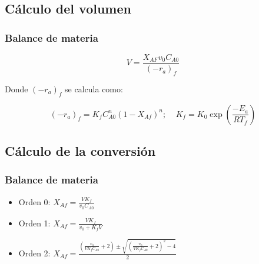 \documentclass[20pt,a4paper]{extarticle}
\begin{document}
	\subsection{Cálculo del volumen}
		\subsubsection{Balance de materia}
			\begin{equation*}
				V= \frac{X_{AF}v_0C_{A0}}{(-r_a)_f}
			\end{equation*}
			
			Donde $(-r_a)_f$ se calcula como:
			
			\begin{equation*}
				(-r_a)_f = K_fC_{A0}^n (1-X_{Af})^n; ~~~~~ K_f = K_0 \exp \left(\frac{-E_a}{RT_f}\right)
			\end{equation*}
	
	\subsection{Cálculo de la conversión}
		\subsubsection{Balance de materia}
			\begin{itemize}
				\item Orden 0: $X_{Af} = \frac{VK_f}{v_0C_{A0}}$
				\item Orden 1: $X_{Af} = \frac{VK_f}{v_0+K_fV}$
				\item Orden 2: $X_{Af} = \frac{\left(\frac{v_0}{VK_fC_{A0}}+2\right)\pm \sqrt{\left(\frac{v_0}{VK_fC_{A0}}+2\right)^2-4}}{2}$
			\end{itemize}
\end{document}
